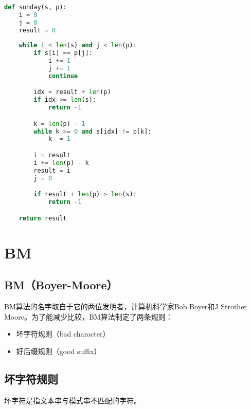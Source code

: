 \begin{lstlisting}[language=Python]
def sunday(s, p):
    i = 0
    j = 0
    result = 0
    
    while i < len(s) and j < len(p):
        if s[i] == p[j]:
            i += 1
            j += 1
            continue

        idx = result + len(p)
        if idx >= len(s):
            return -1

        k = len(p) - 1
        while k >= 0 and s[idx] != p[k]:
            k -= 1

        i = result
        i += len(p) - k
        result = i
        j = 0

        if result + len(p) > len(s):
            return -1

    return result
\end{lstlisting}

\newpage

\section{BM}

\subsection{BM（Boyer-Moore）}

BM算法的名字取自于它的两位发明者，计算机科学家Bob Boyer和J Strother Moore。为了能减少比较，BM算法制定了两条规则：

\begin{itemize}
	\item 坏字符规则（bad character）
	\item 好后缀规则（good suffix）
\end{itemize}

\vspace{0.5cm}

\subsection{坏字符规则}

坏字符是指文本串与模式串不匹配的字符。

